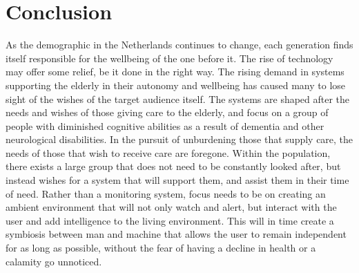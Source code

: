 \documentclass{below-ext}
\begin{document}
\section{Conclusion}
As the demographic in the Netherlands continues to change, each generation finds itself responsible for the wellbeing of the one before it. The rise of technology may offer some relief, be it done in the right way. The rising demand in systems supporting the elderly in their autonomy and wellbeing has caused many to lose sight of the wishes of the target audience itself. The systems are shaped after the needs and wishes of those giving care to the elderly, and focus on a group of people with diminished cognitive abilities as a result of dementia and other neurological disabilities. In the pursuit of unburdening those that supply care, the needs of those that wish to receive care are foregone. Within the population, there exists a large group that does not need to be constantly looked after, but instead wishes for a system that will support them, and assist them in their time of need. Rather than a monitoring system, focus needs to be on creating an ambient environment that will not only watch and alert, but interact with the user and add intelligence to the living environment. This will in time create a symbiosis between man and machine that allows the user to remain independent for as long as possible, without the fear of having a decline in health or a calamity go unnoticed.
\balance


\end{document}
